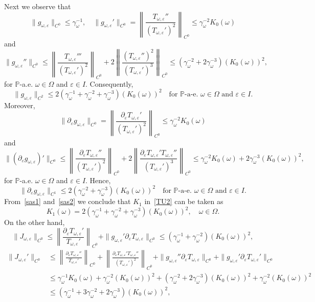 \documentclass[11pt,reqno,a4paper]{article}
\theoremstyle{special}
\renewcommand{\epsilon}{\varepsilon}
\begin{document}
 Next we observe that 
 \[
 \|g_{\omega, \epsilon}\|_{C^0}\le \gamma_\omega^{-1}, \quad \|g_{\omega, \epsilon}'\|_{C^0}=\left \| \frac{T_{\omega, \epsilon}''}{(T_{\omega, \epsilon}')^2} \right \|_{C^0} \le \gamma_\omega^{-2}K_0(\omega)
 \]
 and 
 \[
 \| g_{\omega, \epsilon}''\|_{C^0} \le \left \|\frac{T_{\omega, \epsilon}'''}{(T_{\omega, \epsilon}')^2}\right \|_{C^0}+2\left \| \frac{(T_{\omega, \epsilon}'')^2}{(T_{\omega, \epsilon}')^3}\right \|_{C^0} \le (\gamma_\omega^{-2}+2\gamma_{\omega}^{-3})(K_0(\omega))^2,
 \]
 for $\mathbb P$-a.e. $\omega \in \Omega$ and $\epsilon \in I$. Consequently, 
 \begin{equation}\label{sas1}
 \|g_{\omega, \epsilon}\|_{C^2} \le 2(\gamma_{\omega}^{-1}+\gamma_\omega^{-2}+\gamma_\omega^{-3})(K_0(\omega))^2 \quad \text{for $\mathbb P$-a-e. $\omega \in \Omega$ and $\epsilon \in I$.}
 \end{equation}
 Moreover, 
 \[
 \| \partial_\epsilon g_{\omega, \epsilon} \|_{C^0}=\left \| \frac{\partial_\epsilon T_{\omega, \epsilon}'}{(T_{\omega, \epsilon}')^2}\right \|_{C^0} \le \gamma_\omega^{-2}K_0(\omega)
 \]
 and
 \[
 \|(\partial_\epsilon g_{\omega, \epsilon})'\|_{C^0} \le \left \| \frac{\partial_\epsilon T_{\omega, \epsilon}''}{(T_{\omega, \epsilon}')^2}\right \|_{C^0}+2\left \| \frac{\partial_\epsilon T_{\omega, \epsilon}'T_{\omega, \epsilon}''}{(T_{\omega, \epsilon}')^3}\right \|_{C^0} \le \gamma_\omega^{-2}K_0(\omega)+2\gamma_\omega^{-3}(K_0(\omega))^2,
 \]
 for $\mathbb P$-a.e. $\omega \in \Omega$ and $\epsilon \in I$. Hence, 
 \begin{equation}\label{sas2}
 \| \partial_\epsilon g_{\omega, \epsilon}\|_{C^1}\le 2(\gamma_\omega^{-2}+\gamma_\omega^{-3})(K_0(\omega))^2 \quad \text{for $\mathbb P$-a-e. $\omega \in \Omega$ and $\epsilon \in I$.}
 \end{equation}
 From~\eqref{sas1} and~\eqref{sas2} we conclude that $K_1$ in~\eqref{TU2} can be taken as 
 \begin{equation}\label{K1 def}
K_1(\omega)=2(\gamma_\omega^{-1}+\gamma_\omega^{-2}+\gamma_\omega^{-3})(K_0(\omega))^2, \quad \omega \in \Omega.     
 \end{equation}
On the other hand, 
\[
\| J_{\omega, \epsilon}\|_{C^0} \le \left \| \frac{\partial_\epsilon T_{\omega, \epsilon}'}{T_{\omega, \epsilon}'}\right \|_{C^0}+\| g_{\omega, \epsilon}'\partial_\epsilon T_{\omega, \epsilon}\|_{C^0} \le (\gamma_\omega^{-1}+\gamma_\omega^{-2})(K_0(\omega))^2,
\]
\[
\begin{split}
\| J_{\omega, \epsilon}'\|_{C^0} &\le \left \| \frac{\partial_\epsilon T_{\omega, \epsilon}'' }{T_{\omega, \epsilon}'}\right \|_{C^0}+\left \| \frac{\partial_\epsilon T_{\omega, \epsilon}' T_{\omega, \epsilon}''}{(T_{\omega, \epsilon}')^2}\right \|_{C^0}+\|g_{\omega, \epsilon}''\partial_\epsilon T_{\omega, \epsilon}\|_{C^0}+\|g_{\omega, \epsilon}' \partial_\epsilon T_{\omega, \epsilon}'\|_{C^0} \\
&\le \gamma_\omega^{-1}K_0(\omega)+\gamma_\omega^{-2}(K_0(\omega))^2+ (\gamma_\omega^{-2}+2\gamma_\omega^{-3})(K_0(\omega))^2 +\gamma_{\omega}^{-2}(K_0(\omega))^2 \\
&\le (\gamma_\omega^{-1}+3\gamma_\omega^{-2}+2\gamma_\omega^{-3})(K_0(\omega))^2,
\end{split}
\]
\end{document}
